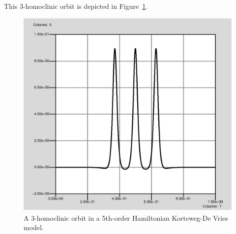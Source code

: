 \documentclass[12pt]{report}
\begin{document}
This 3-homoclinic orbit is depicted in Figure~\ref{kdv3hom}.
\begin{figure}[htb]
\begin{center}
\includegraphics[scale=0.5]{include/kdv3hom.eps}
\caption{A 3-homoclinic orbit in a 5th-order Hamiltonian 
Korteweg-De Vries model.}
\label{kdv3hom}
\end{center}
\end{figure}



 \label{sec:bibliography}
\end{document}
